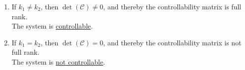 \begin{enumerate}[label= (\roman*)]
    \item If \( k_{1} \neq k_{2} \), then \( \det(\mathcal{C}) \neq 0 \), and thereby the controllability matrix is full rank. \\
          The system is \underline{controllable}.

    \item If \( k_{1} = k_{2} \), then \( \det(\mathcal{C}) = 0 \), and thereby the controllability matrix is not full rank. \\
          The system is \underline{not controllable}.
\end{enumerate}
